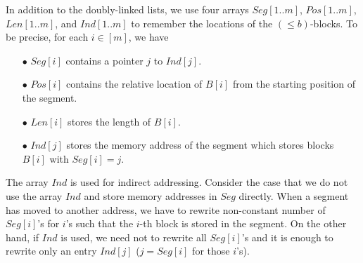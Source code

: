 \documentclass{llncs}
\begin{document}
In addition to the doubly-linked lists, we use four arrays
$Seg[1..m]$, $Pos[1..m]$, $Len[1..m]$, and $Ind[1..m]$ to
remember the locations of the $(\leq b)$-blocks.
To be precise, for each $i \in [m]$, we have
\begin{itemize}
\item[{\raise0.3pt\hbox{$\bullet$}}]
$Seg[i]$ contains a pointer $j$ to $Ind[j]$.
\item[{\raise0.3pt\hbox{$\bullet$}}]
$Pos[i]$ contains the relative location of $B[i]$
from the starting position of the segment.
\item[{\raise0.3pt\hbox{$\bullet$}}]
$Len[i]$ stores the length of $B[i]$.
\item[{\raise0.3pt\hbox{$\bullet$}}]
$Ind[j]$ stores the memory address of the segment which stores blocks
$B[i]$ with $Seg[i] = j$.
\end{itemize}
The array $Ind$ is used for indirect addressing.
Consider the case that we do not use the array $Ind$ and store memory addresses 
in $Seg$ directly.
When a segment has moved to another address, we have to rewrite non-constant
number of $Seg[i]$'s for $i$'s such that the $i$-th block is stored in the segment.
On the other hand, if $Ind$ is used,  we need not to rewrite all $Seg[i]$'s and
it is enough to rewrite only an entry $Ind[j]$ ($j = Seg[i]$ for those $i$'s).

\medskip
\end{document}
